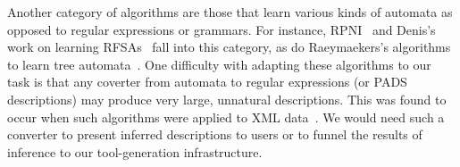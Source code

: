 

Another category of algorithms are those that learn various kinds of
automata as opposed to regular expressions or grammars.  For instance,
RPNI~\cite{rpni} and Denis's work on learning
RFSAs~\cite{denis:learning-regular-languages} fall into this category,
as do Raeymaekers's algorithms to learn tree
automata~\cite{raeymaekers+:learning-tree-languages,raeymaekers+:wrapper-induction}.
One difficulty with adapting these algorithms to our task is that any
coverter from automata to regular expressions (or PADS descriptions)
may produce very large, unnatural descriptions.  This was found to
occur when such algorithms were applied to XML
data~\cite{bex+:dtd-inference}.  We would need such a converter to
present inferred descriptions to users or to funnel the results of
inference to our tool-generation infrastructure.



  

